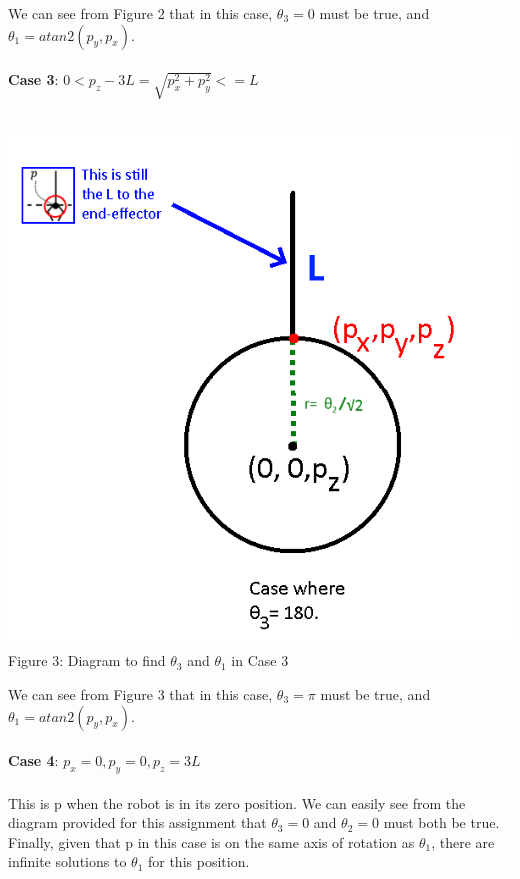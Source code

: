 \documentclass{article}
\begin{document}
We can see from Figure 2 that in this case, $\theta_{3} = 0$ must be true, and $\theta_1 = atan2(p_y,p_x)$. 
\\
\\
\textbf{Case 3}: $0 < p_z - 3L = \sqrt{p_x^2 + p_y^2} <= L $
\\
\\
 \begin{center}
            \includegraphics[scale=0.5]{a3robot2_fix.png}\\
            Figure 3: Diagram to find $\theta_3$ and $\theta_1$ in Case 3
            \\
 \end{center}
We can see from Figure 3 that in this case, $\theta_{3} = \pi$ must be true, and $\theta_1 = atan2(p_y,p_x)$. 
\\
\\
\textbf{Case 4}: $p_x = 0, p_y = 0, p_z = 3L$
\\
\\
This is p when the robot is in its zero position. We can easily see from the diagram provided for this assignment that $\theta_3=0$ and $\theta_2=0$ must both be true. Finally, given that p in this case is on the same axis of rotation as $\theta_1$, there are infinite solutions to $\theta_1$ for this position. 
\\
\end{document}
